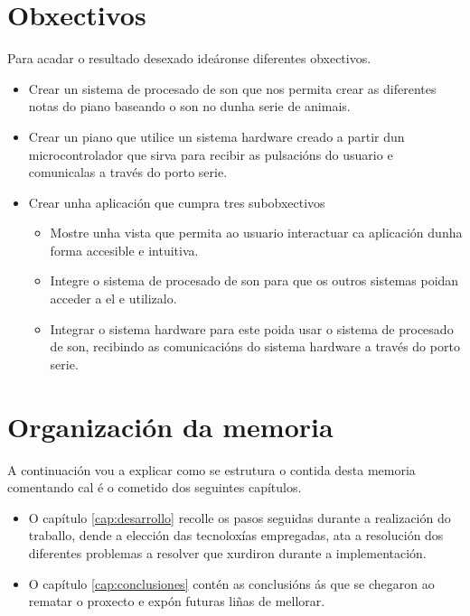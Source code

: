  \section{Obxectivos}
Para acadar o resultado desexado ideáronse diferentes obxectivos.
\begin{itemize}
\item Crear un sistema de procesado de son que nos permita crear as diferentes notas do piano baseando o son no dunha serie de animais. 
\item Crear un piano que utilice un sistema hardware creado a partir dun microcontrolador que sirva para recibir as pulsacións do usuario e comunicalas a través do porto serie.
\item Crear unha aplicación que cumpra tres subobxectivos
    \begin{itemize}
        \item Mostre unha vista que permita ao usuario interactuar ca aplicación dunha forma accesible e intuitiva.
        \item Integre o sistema de procesado de son para que os outros sistemas poidan acceder a el e utilizalo. 
        \item Integrar o sistema hardware para este poida usar o sistema de procesado de son, recibindo as comunicacións do sistema hardware a través do porto serie.
    \end{itemize} 
\end{itemize}
    


\section{Organización da memoria}
A continuación vou a explicar como se estrutura o contida desta memoria comentando cal é o cometido dos seguintes capítulos.
\begin{itemize}
\item O capítulo  \ref{cap:desarrollo} recolle os pasos seguidas durante a realización do traballo, dende a elección das tecnoloxías empregadas, ata a resolución dos diferentes problemas a resolver que xurdiron durante a implementación.
\item O capítulo \ref{cap:conclusiones} contén as conclusións ás que se chegaron ao rematar o proxecto e expón futuras liñas de mellorar.
\end{itemize}
